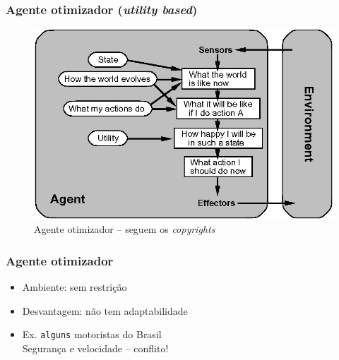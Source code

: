 

\begin{frame} %

 \frametitle{Agente otimizador (\textit{utility based})}

\begin{figure}[!ht]
  \centering
  \includegraphics[height =.6\textheight,width=.7\textwidth]
  {figuras/agente_otimizador.jpg}
  \caption{Agente otimizador -- seguem os \textit{copyrights}}
\end{figure}

\end{frame}


\begin{frame} %

    \frametitle{Agente otimizador}

\begin{itemize}
  \item Ambiente: sem restrição
  
  \item Desvantagem: não  tem adaptabilidade
  
  \item Ex. \texttt{alguns} motoristas do Brasil\\
    Segurança e velocidade – conflito!
  
\end{itemize}
\end{frame}




